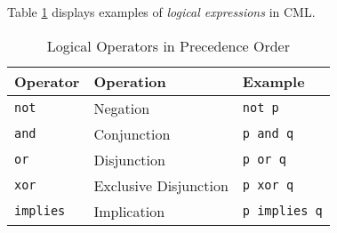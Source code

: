 Table \ref{tab:logical-expr-examples} displays examples of
\emph{logical expressions} in CML.

\begin{table}[H]
\centering
\begin{tabular}
{ l l l }
\hline
Operator & Operation & Example \\
\hline
\verb!not! & Negation & \verb!not p! \\
\verb!and! & Conjunction & \verb!p and q! \\
\verb!or! & Disjunction & \verb!p or q! \\
\verb!xor! & Exclusive Disjunction & \verb!p xor q! \\
\verb!implies! & Implication & \verb!p implies q! \\
\end{tabular}
\caption{Logical Operators in Precedence Order}
\label{tab:logical-expr-examples}
\end{table}
